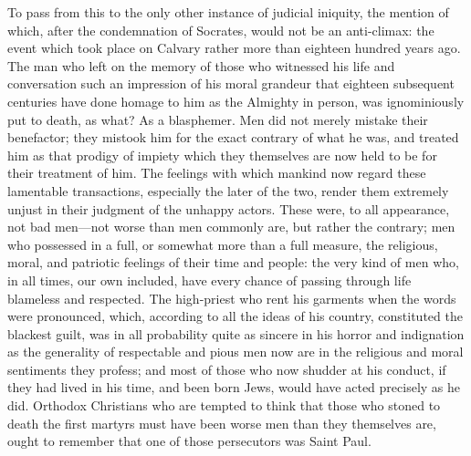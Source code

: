 \documentclass[11pt,openany]{book}
\begin{document}
To pass from this to the only other instance of judicial iniquity, the mention of which, after the condemnation of Socrates, would not be an anti-climax: the event which took place on Calvary rather more than eighteen hundred years ago. The man who left on the memory of those who witnessed his life and conversation such an impression of his moral grandeur that eighteen subsequent centuries have done homage to him as the Almighty in person, was ignominiously put to death, as what? As a blasphemer. Men did not merely mistake their benefactor; they mistook him for the exact contrary of what he was, and treated him as that prodigy of impiety which they themselves are now held to be for their treatment of him. The feelings with which mankind now regard these lamentable transactions, especially the later of the two, render them extremely unjust in their judgment of the unhappy actors. These were, to all appearance, not bad men---not worse than men commonly are, but rather the contrary; men who possessed in a full, or somewhat more than a full measure, the religious, moral, and patriotic feelings of their time and people: the very kind of men who, in all times, our own included, have every chance of passing through life blameless and respected. The high-priest who rent his garments when the words were pronounced, which, according to all the ideas of his country, constituted the blackest guilt, was in all probability quite as sincere in his horror and indignation as the generality of respectable and pious men now are in the religious and moral sentiments they profess; and most of those who now shudder at his conduct, if they had lived in his time, and been born Jews, would have acted precisely as he did. Orthodox Christians who are tempted to think that those who stoned to death the first martyrs must have been worse men than they themselves are, ought to remember that one of those persecutors was Saint Paul.
\end{document}
